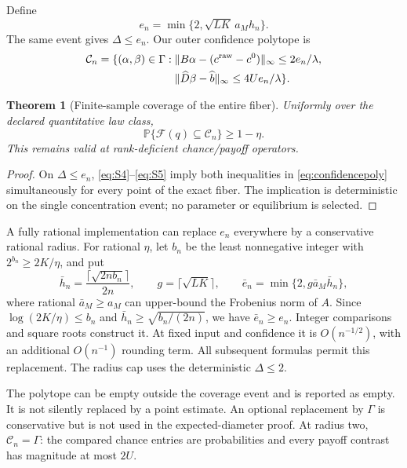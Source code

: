 \documentclass[11pt,a4paper]{article}
\numberwithin{equation}{section}
\newtheorem{theorem}{Theorem}
\theoremstyle{definition}
\newcommand{\Prob}{\mathbb P}
\begin{document}
Define
\begin{equation}\label{eq:S9}
 e_n=\min\{2,\sqrt{LK}\,a_Mh_n\}.
\end{equation}
The same event gives \(\Delta\le e_n\).
Our outer confidence polytope is
\begin{equation}\label{eq:confidencepoly}
 \begin{split}
 \mathcal C_n=\{(\alpha,\beta)\in\Gamma:\;&
  \|B\alpha-(c^{\rm raw}-c^0)\|_\infty\le2e_n/\lambda,\\
 &\|\widehat D\beta-\widehat b\|_\infty\le4Ue_n/\lambda\}.
 \end{split}
\end{equation}

\begin{theorem}[Finite-sample coverage of the entire fiber]
\label{thm:confidence}
Uniformly over the declared quantitative law class,
\begin{equation}\label{eq:S10}
 \Prob\{\mathcal F(q)\subseteq\mathcal C_n\}\ge1-\eta .
\end{equation}
This remains valid at rank-deficient chance/payoff operators.
\end{theorem}
\begin{proof}
On \(\Delta\le e_n\), \eqref{eq:S4}--\eqref{eq:S5} imply both
inequalities in \eqref{eq:confidencepoly} simultaneously for every
point of the exact fiber. The implication is deterministic on the
single concentration event; no parameter or equilibrium is selected.
\end{proof}

A fully rational implementation can replace \(e_n\) everywhere by
a conservative rational radius. For rational \(\eta\), let \(b_n\)
be the least nonnegative integer with \(2^{b_n}\ge2K/\eta\), and put
\begin{equation}\label{eq:rationalradius}
 \bar h_n=\frac{\lceil\sqrt{2nb_n}\rceil}{2n},\qquad
 g=\lceil\sqrt{LK}\rceil,\qquad
 \bar e_n=\min\{2,g\bar a_M\bar h_n\},
\end{equation}
where rational \(\bar a_M\ge a_M\) can upper-bound the Frobenius norm
of \(A\). Since \(\log(2K/\eta)\le b_n\) and
\(\bar h_n\ge\sqrt{b_n/(2n)}\), we have \(\bar e_n\ge e_n\).
Integer comparisons and square roots construct it. At fixed input
and confidence it is \(O(n^{-1/2})\), with an additional
\(O(n^{-1})\) rounding term. All subsequent formulas permit this
replacement. The radius cap uses the deterministic \(\Delta\le2\).

The polytope can be empty outside the coverage event and is reported
as empty. It is not silently replaced by a point estimate.
An optional replacement by \(\Gamma\) is conservative but is not
used in the expected-diameter proof. At radius two,
\(\mathcal C_n=\Gamma\): the compared chance entries are probabilities
and every payoff contrast has magnitude at most \(2U\).
\end{document}
